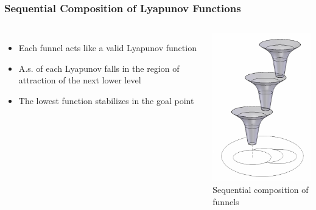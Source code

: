 \documentclass{beamer}
\begin{document}
\begin{frame}
\frametitle{Sequential Composition of Lyapunov Functions}

\begin{columns}[c] 
\begin{itemize}
\item Each funnel acts like a valid Lyapunov function \vspace{0.2cm}
\item A.s. of each Lyapunov falls in the region of attraction of the next lower level \vspace{0.2cm}
\item The lowest function stabilizes in the goal point
\end{itemize}

\centering
 \includegraphics[width=.5\textwidth]{figures/SeqentialLyapunov_Funnels.png}\\
\scriptsize{Sequential composition of funnels  \cite{p2}}
\end{columns}

\end{frame}


\end{document}
